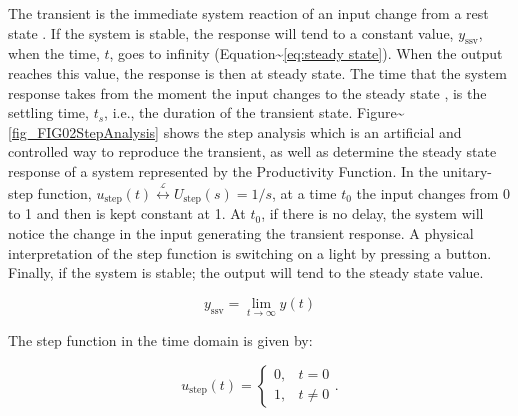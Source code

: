 \documentclass{article}
\begin{document}
The transient is the immediate system reaction of an input change from a rest state \citep{Ogata2010}.
If the system is stable, the response will tend to a constant value, \(y_{\mbox{ssv}}\), when the time, \(t\), goes to infinity (Equation\textasciitilde{}\ref{eq:steady state}).
When the output reaches this value, the response is then at steady state.
The time that the system response takes from the moment the input changes to the steady state \citep{Nise2010,Ogata2010}, is the settling time, \(t_s\), i.e., the duration of the transient state.
Figure\textasciitilde{}\ref{fig_FIG02StepAnalysis} shows the step analysis which is an artificial and controlled way to reproduce the transient, as well as determine the steady state response of a system represented by the Productivity Function.
In the unitary-step function, \(u_{\mbox{step}}(t) \overset{\underset{\mathrm{\mathcal{L}}}{}}{\leftrightarrow} U_{\mbox{step}}(s) = 1/s\), at a time \(t_0\) the input changes from 0 to 1 and then is kept constant at 1.
At \(t_0\), if there is no delay, the system will notice the change in the input generating the transient response.
A physical interpretation of the step function is switching on a light by pressing a button.
Finally, if the system is stable; the output will tend to the steady state value.

\begin{equation}\label{eq:steady state}
	y_{\mbox{ssv}} = \lim_{t\rightarrow \infty} y(t)
\end{equation}

The step function in the time domain is given by:

\begin{equation}\label{eq:Step function in time domain P7}
	u_{\mbox{step}}(t) =
	\begin{cases}
 	0, & t = 0 \\
  	1, & t \ne 0
	\end{cases}.
\end{equation}
\end{document}

